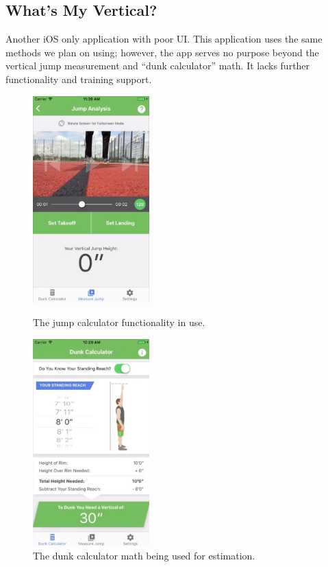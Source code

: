 \subsection{What's My Vertical?}
\label{research:whats-my-vert}
Another iOS only application with poor UI. This application uses the same methods we plan on using; however, the
app serves no purpose beyond the vertical jump measurement and ``dunk calculator'' math.
It lacks further functionality and training support.
\vspace{-5mm}
\begin{figure}[H]
	\centering
	\begin{minipage}{0.45\textwidth}
		\centering
		\includegraphics[width=0.4\textwidth]{graphics/whatsmyvert/jumpcalc.jpg}
		\caption{The jump calculator functionality in use.}
		\label{fig:whatsmyvert-jump}
	\end{minipage}%
	\begin{minipage}{0.45\textwidth}
		\centering
		\includegraphics[width=0.4\textwidth]{graphics/whatsmyvert/dunkcalcmaths.jpg}
		\caption{The dunk calculator math being used for estimation.}
		\label{fig:whatsmyvert-math}
	\end{minipage}%
\end{figure}
\pagebreak

